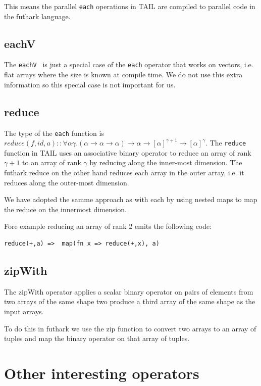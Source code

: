 \documentclass[11pt]{article}
\begin{document}
This means the parallel {\tt each} operations in TAIL are compiled to parallel code in the futhark language.

\subsection{eachV}
The {\tt eachV } is just a special case of the {\tt each} operator that works on vectors, i.e. flat arrays where the size
is known at compile time. We do not use this extra information so this special case is not important for us.

\subsection{reduce}
The type of the {\tt each} function is $reduce(f,id,a) :: \forall\alpha\gamma.(\alpha \to \alpha \to \alpha) \to \alpha \to [\alpha]^{\gamma+1} \to [\alpha]^\gamma$.
The {\tt reduce} function in TAIL uses an associative binary operator to reduce an array of rank $\gamma+1$ to an array of rank $\gamma$ by reducing along the inner-most dimension. The futhark reduce on the other hand reduces each array in the outer array, i.e. it reduces along the outer-most dimension. 

We have adopted the samme approach as with each by using nested maps to map the reduce on the innermost dimension.

Fore example reducing an array of rank 2 emits the following code:

\begin{lstlisting}[numbers=none,frame=none]
reduce(+,a)	=> 	map(fn x => reduce(+,x), a)
\end{lstlisting}

\subsection{zipWith}

The zipWith operator applies a scalar binary operator on pairs of elements from two arrays of the same shape two
produce a third array of the same shape as the input arrays.

 To do this in futhark we use the zip function to convert two arrays to an array of tuples and map the binary operator on that array of tuples.

\section{Other interesting operators}
\end{document}
